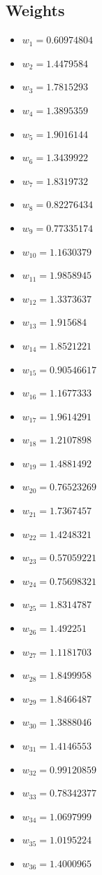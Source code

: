 \documentclass[11pt]{article}
\begin{document}
\subsection*{Weights}
\begin{itemize}
\item $w_{1} = 0.60974804$
\item $w_{2} = 1.4479584$
\item $w_{3} = 1.7815293$
\item $w_{4} = 1.3895359$
\item $w_{5} = 1.9016144$
\item $w_{6} = 1.3439922$
\item $w_{7} = 1.8319732$
\item $w_{8} = 0.82276434$
\item $w_{9} = 0.77335174$
\item $w_{10} = 1.1630379$
\item $w_{11} = 1.9858945$
\item $w_{12} = 1.3373637$
\item $w_{13} = 1.915684$
\item $w_{14} = 1.8521221$
\item $w_{15} = 0.90546617$
\item $w_{16} = 1.1677333$
\item $w_{17} = 1.9614291$
\item $w_{18} = 1.2107898$
\item $w_{19} = 1.4881492$
\item $w_{20} = 0.76523269$
\item $w_{21} = 1.7367457$
\item $w_{22} = 1.4248321$
\item $w_{23} = 0.57059221$
\item $w_{24} = 0.75698321$
\item $w_{25} = 1.8314787$
\item $w_{26} = 1.492251$
\item $w_{27} = 1.1181703$
\item $w_{28} = 1.8499958$
\item $w_{29} = 1.8466487$
\item $w_{30} = 1.3888046$
\item $w_{31} = 1.4146553$
\item $w_{32} = 0.99120859$
\item $w_{33} = 0.78342377$
\item $w_{34} = 1.0697999$
\item $w_{35} = 1.0195224$
\item $w_{36} = 1.4000965$

\end{itemize}
\end{document}

